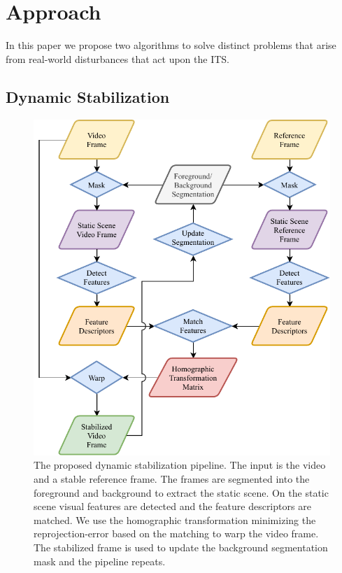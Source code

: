 
\section{Approach}
In this paper we propose two algorithms to solve distinct problems that arise from real-world disturbances that act upon the ITS.

\subsection{Dynamic Stabilization}
\label{sec:dynamic_stabilization_approach}

\begin{figure}[t]
   \begin{center}
      \includegraphics[width=0.8\linewidth]{diagrams/DynamicStabilization.pdf}
   \end{center}
   \caption{
      The proposed dynamic stabilization pipeline. 
      The input is the video and a stable reference frame.
      The frames are segmented into the foreground and background to extract the static scene.
      On the static scene visual features are detected and the feature descriptors are matched.
      We use the homographic transformation minimizing the reprojection-error based on the matching to warp the video frame.
      The stabilized frame is used to update the background segmentation mask and the pipeline repeats.
       }
   \label{fig:dynamic_stabilization_algorithm}
\end{figure}

